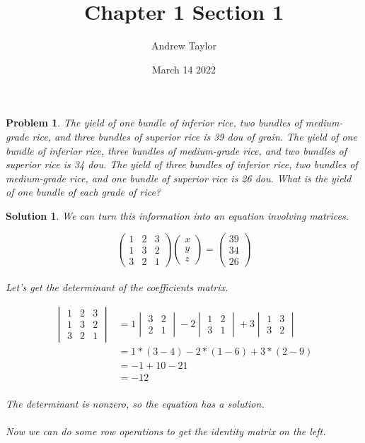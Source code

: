 \documentclass{article}
\title{Chapter 1 Section 1}
\author{Andrew Taylor}
\date{March 14 2022}
\newtheorem{problem}{Problem}
\newtheorem*{solution}{Solution}
\begin{document}
\maketitle

\begin{problem}
The yield of one bundle of inferior rice, two bundles of medium-grade rice, and three bundles of superior rice is 39 dou of grain. The yield of one bundle of inferior rice, three bundles of medium-grade rice, and two bundles of superior rice is 34 dou. The yield of three bundles of inferior rice, two bundles of medium-grade rice, and one bundle of superior rice is 26 dou. What is the yield of one bundle of each grade of rice?
\end{problem}

\begin{solution}
We can turn this information into an equation involving matrices.

\begin{equation*}
\begin{pmatrix}
1 & 2 & 3 \\
1 & 3 & 2 \\
3 & 2 & 1
\end{pmatrix}
\begin{pmatrix}
x \\ 
y \\
z
\end{pmatrix}
=
\begin{pmatrix}
39 \\
34 \\
26
\end{pmatrix}
\end{equation*} \\

Let's get the determinant of the coefficients matrix.

\begin{align*}
\begin{vmatrix}
1 & 2 & 3 \\
1 & 3 & 2 \\
3 & 2 & 1
\end{vmatrix}
&= 
1 \begin{vmatrix}3 & 2 \\ 2 & 1\end{vmatrix} 
- 2 \begin{vmatrix} 1 & 2 \\ 3 & 1\end{vmatrix}
+ 3 \begin{vmatrix}1 & 3 \\ 3 & 2\end{vmatrix} \\
&= 1 * (3 - 4) - 2 * (1 - 6) + 3 * (2 - 9) \\
&= -1 + 10 - 21 \\
&= -12
\end{align*}
\\
The determinant is nonzero, so the equation has a solution.
\\
\\
Now we can do some row operations to get the identity matrix on the left.


\end{solution}
\end{document}
